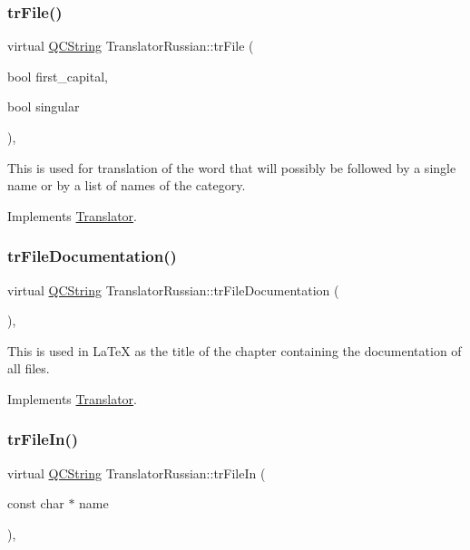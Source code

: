 \subsubsection{\texorpdfstring{trFile()}{trFile()}}
{\footnotesize\ttfamily virtual \mbox{\hyperlink{class_q_c_string}{Q\+C\+String}} Translator\+Russian\+::tr\+File (\begin{DoxyParamCaption}\item[{bool}]{first\+\_\+capital,  }\item[{bool}]{singular }\end{DoxyParamCaption})\hspace{0.3cm}{\ttfamily [inline]}, {\ttfamily [virtual]}}

This is used for translation of the word that will possibly be followed by a single name or by a list of names of the category. 

Implements \mbox{\hyperlink{class_translator}{Translator}}.

\mbox{\label{class_translator_russian_a85754b82221368b714f89a03d1974ed1}} 
\subsubsection{\texorpdfstring{trFileDocumentation()}{trFileDocumentation()}}
{\footnotesize\ttfamily virtual \mbox{\hyperlink{class_q_c_string}{Q\+C\+String}} Translator\+Russian\+::tr\+File\+Documentation (\begin{DoxyParamCaption}{ }\end{DoxyParamCaption})\hspace{0.3cm}{\ttfamily [inline]}, {\ttfamily [virtual]}}

This is used in La\+TeX as the title of the chapter containing the documentation of all files. 

Implements \mbox{\hyperlink{class_translator}{Translator}}.

\mbox{\label{class_translator_russian_a803151c6bc493a1505354c3017ed7140}} 
\subsubsection{\texorpdfstring{trFileIn()}{trFileIn()}}
{\footnotesize\ttfamily virtual \mbox{\hyperlink{class_q_c_string}{Q\+C\+String}} Translator\+Russian\+::tr\+File\+In (\begin{DoxyParamCaption}\item[{const char $\ast$}]{name }\end{DoxyParamCaption})\hspace{0.3cm}{\ttfamily [inline]}, {\ttfamily [virtual]}}

